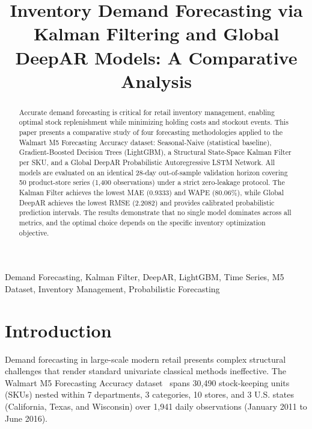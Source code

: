 \documentclass[conference]{IEEEtran}
\title{Inventory Demand Forecasting via Kalman Filtering and Global DeepAR Models: A Comparative Analysis}
\author{
    \IEEEauthorblockN{Sameer Alam Khan}
    \IEEEauthorblockA{Enrollment No. 2401020054}
    \and
    \IEEEauthorblockN{Abhishek Tripathi}
    \IEEEauthorblockA{Enrollment No. 2401010022}
    \and
    \IEEEauthorblockN{Akshay Y}
    \IEEEauthorblockA{Enrollment No. 2401020008}
    \linebreakand
    \IEEEauthorblockN{Palaparthi Harsha Karthikeya}
    \IEEEauthorblockA{Enrollment No. 2401010313}
    \and
    \IEEEauthorblockN{Dakarapu Hemamdhar Nath}
    \IEEEauthorblockA{Enrollment No. 2401010137}
}
\begin{document}
\maketitle

\begin{abstract}
Accurate demand forecasting is critical for retail inventory management, enabling optimal stock replenishment while minimizing holding costs and stockout events. This paper presents a comparative study of four forecasting methodologies applied to the Walmart M5 Forecasting Accuracy dataset: Seasonal-Naive (statistical baseline), Gradient-Boosted Decision Trees (LightGBM), a Structural State-Space Kalman Filter per SKU, and a Global DeepAR Probabilistic Autoregressive LSTM Network. All models are evaluated on an identical 28-day out-of-sample validation horizon covering 50 product-store series (1,400 observations) under a strict zero-leakage protocol. The Kalman Filter achieves the lowest MAE (0.9333) and WAPE (80.06\%), while Global DeepAR achieves the lowest RMSE (2.2082) and provides calibrated probabilistic prediction intervals. The results demonstrate that no single model dominates across all metrics, and the optimal choice depends on the specific inventory optimization objective.
\end{abstract}

\begin{IEEEkeywords}
Demand Forecasting, Kalman Filter, DeepAR, LightGBM, Time Series, M5 Dataset, Inventory Management, Probabilistic Forecasting
\end{IEEEkeywords}

\section{Introduction}

Demand forecasting in large-scale modern retail presents complex structural challenges that render standard univariate classical methods ineffective. The Walmart M5 Forecasting Accuracy dataset~\cite{makridakis2022m5} spans 30,490 stock-keeping units (SKUs) nested within 7 departments, 3 categories, 10 stores, and 3 U.S. states (California, Texas, and Wisconsin) over 1,941 daily observations (January 2011 to June 2016).
\end{document}
